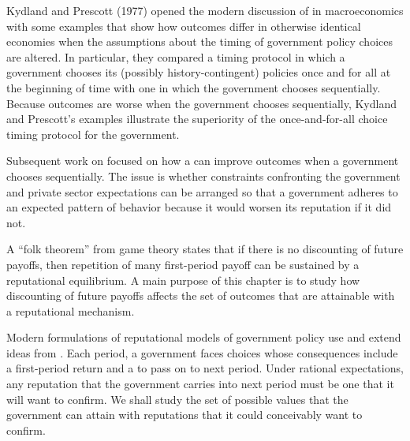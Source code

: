 Kydland and Prescott (1977)
opened the modern discussion of  in macroeconomics
with some examples that show how outcomes differ in otherwise
identical economies when the assumptions about the timing of
government policy choices are altered.   In particular, they compared
a timing protocol in which a government chooses its (possibly
history-contingent) policies once and for all at the beginning of
time with one in which the government chooses sequentially.
Because outcomes are worse when the government chooses sequentially,
Kydland and Prescott's examples illustrate the superiority of the once-and-for-all choice timing protocol
for the government.%
%
%
%
%

Subsequent work on 
focused on how
a  can improve outcomes  when a government chooses sequentially.  The issue is whether
constraints confronting the government and private sector expectations %
can be arranged so that a government
adheres to an expected
pattern of behavior because it would worsen its  reputation
if it did not.%
%
%
    

A ``folk theorem'' from game theory states that if there is no discounting of future payoffs,
then repetition of many  first-period payoff can be sustained by a reputational
equilibrium.  A main purpose of this chapter is to study how discounting of future payoffs
affects the set of  outcomes that are attainable with a reputational
mechanism.
%

Modern formulations of reputational models of government policy use and extend ideas
from .   Each period, a government faces choices whose
consequences include a first-period return and a 
to pass on to next period. Under rational expectations, any reputation that
the government carries into next period must be one that it will want to confirm.
We shall study the set of possible values that the government can attain with
reputations that it could conceivably want to confirm.
%
%
%
%
%
%

